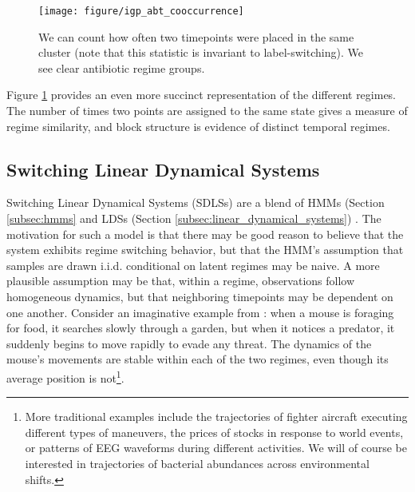 \documentclass[14pt]{extarticle}
\begin{document}
\begin{figure}
  \centering
  \texttt{[image: figure/igp\_abt\_cooccurrence]}
  \caption{We can count how often two timepoints were placed in the same cluster
    (note that this statistic is invariant to label-switching). We see clear
    antibiotic regime groups. \label{fig:igp_abt_cooccurrence}}
\end{figure}

Figure \ref{fig:igp_abt_cooccurrence} provides an even more succinct
representation of the different regimes. The number of times two points are
assigned to the same state gives a measure of regime similarity, and block
structure is evidence of distinct temporal regimes.

\subsection{Switching Linear Dynamical Systems}
\label{subsubsec:switching_dynamical}

Switching Linear Dynamical Systems (SDLSs) are a blend of HMMs (Section
\ref{subsec:hmms} and LDSs (Section \ref{subsec:linear_dynamical_systems})
\citep{ghahramani1998variational, fox2009sharing, linderman2016recurrent}. The
motivation for such a model is that there may be good reason to believe that the
system exhibits regime switching behavior, but that the HMM's assumption that
samples are drawn i.i.d. conditional on latent regimes may be naive. A more
plausible assumption may be that, within a regime, observations follow
homogeneous dynamics, but that neighboring timepoints may be dependent on one
another. Consider an imaginative example from \citep{linderman2016recurrent}:
when a mouse is foraging for food, it searches slowly through a garden, but when
it notices a predator, it suddenly begins to move rapidly to evade any threat.
The dynamics of the mouse's movements are stable within each of the two regimes,
even though its average position is not\footnote{More traditional examples
  include the trajectories of fighter aircraft executing different types of
  maneuvers, the prices of stocks in response to world events, or patterns of
  EEG waveforms during different activities. We will of course be interested in
  trajectories of bacterial abundances across environmental shifts.}.
\end{document}
